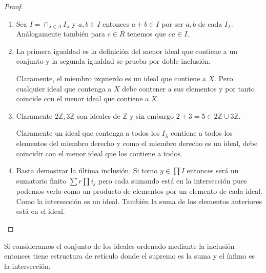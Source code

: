 \begin{proof}
	\begin{enumerate}
		\item Sea $I = \cap_{\lambda \in \Lambda} I_\lambda$ y $a,b \in I$ entonces $a+b \in I$ por ser $a,b$ de cada $I_\lambda$. Análogamente también para $c \in R$ tenemos que $ca \in I$. 
	
		\item La primera igualdad es la definición del menor ideal que contiene a un conjunto y la segunda igualdad se prueba por doble inclusión. 
		
		Claramente, el miembro izquierdo es un ideal que contiene a $X$. Pero cualquier ideal que contenga a $X$ debe contener a sus elementos y por tanto coincide con el menor ideal que contiene a $X$.
		
		\item Claramente $2\mathbb{Z},3\mathbb{Z}$ son ideales de $\mathbb{Z}$ y sin embargo $2+3 = 5 \in 2\mathbb{Z} \cup 3\mathbb{Z}$. 
		
		Claramente un ideal que contenga a todos los $I_\lambda$ contiene a todos los elementos del miembro derecho y como el miembro derecho es un ideal, debe coincidir con el menor ideal que los contiene a todos. 
		
		\item Basta demostrar la última inclusión. Si tomo $y \in \prod I$ entonces será un sumatorio finito $\sum r \prod i_j$  pero cada sumando está en la intersección pues podemos verlo como un producto de elementos por un elemento de cada ideal. Como la intersección es un ideal. También la suma de los elementos anteriores está en el ideal. 
	\end{enumerate}
\end{proof}

\begin{corollary}
Si consideramos el conjunto de los ideales ordenado mediante la inclusión entonces tiene estructura de retículo donde el supremo es la suma y el ínfimo es la intersección. 
\end{corollary}


